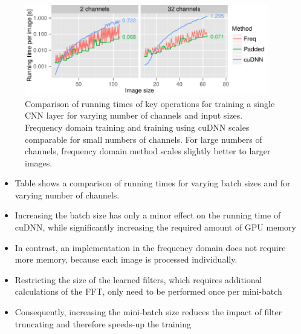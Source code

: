 \begin{figure}
\centering
\includegraphics[width=0.95\textwidth]{figures/imagesize}
\caption[Comparison of running times of key operations for training a single
CNN layer.]{Comparison of running times of key operations for training a single
CNN layer for varying number of channels and input sizes. Frequency domain
training and training using cuDNN scales comparable for small numbers of
channels. For large numbers of channels, frequency domain method scales
slightly better to larger images.}
\end{figure}

\begin{itemize}
\item Table shows a comparison of running times for varying batch sizes and
for varying number of channels.
\item Increasing the batch size has only a minor effect on the running time of
cuDNN, while significantly increasing the required amount of GPU memory
\item In contrast, an implementation in the frequency domain does not require
more memory, because each image is processed individually.
\item Restricting the size of the learned filters, which requires additional
calculations of the FFT, only need to be performed once per mini-batch
\item Consequently, increasing the mini-batch size reduces the impact of filter
truncating and therefore speeds-up the training
\end{itemize}

